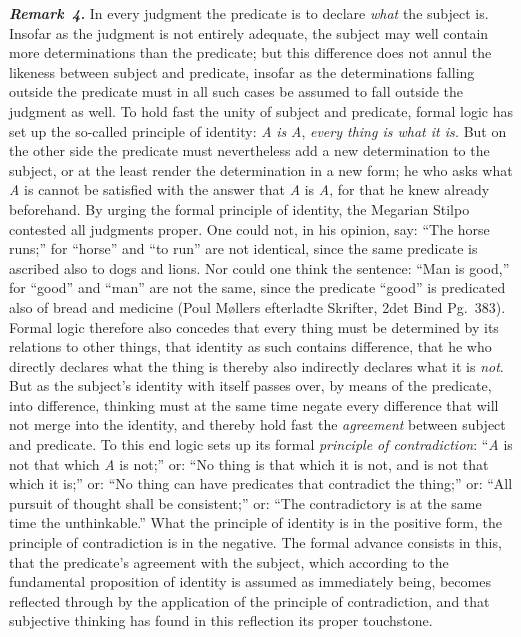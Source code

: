 \documentclass[12pt]{book}
\newcommand{\anm}[1]{\emph{\textbf{Remark~#1.}}}
\begin{document}
\anm{4} In every judgment the predicate is to declare \emph{what} the
subject is. Insofar as the judgment is not entirely adequate, the subject
may well contain more determinations than the predicate; but this difference
does not annul the likeness between subject and predicate, insofar as the
determinations falling outside the predicate must in all such cases be
assumed to fall outside the judgment as well. To hold fast the unity of
subject and predicate, formal logic has set up the so-called principle of
identity: \textit{A} \emph{is} \textit{A}, \emph{every thing is what it
is.} But on the other side the predicate must nevertheless add a new
determination to the subject, or at the least render the determination in a
new form; he who asks what \textit{A} is cannot be satisfied with the answer
that \textit{A} is \textit{A}, for that he knew already beforehand. By
urging the formal principle of identity, the Megarian Stilpo contested all
judgments proper. One could not, in his opinion, say: ``The horse runs;''
for ``horse'' and ``to run'' are not identical, since the same predicate is
ascribed also to dogs and lions. Nor could one think the sentence: ``Man is
good,'' for ``good'' and ``man'' are not the same, since the predicate
``good'' is predicated also of bread and medicine (Poul Møllers efterladte
Skrifter, 2det Bind Pg.\ 383). Formal logic therefore also concedes that
every thing must be determined by its relations to other things, that
identity as such contains difference, that he who directly declares what the
thing is thereby also indirectly declares what it is \emph{not}. But as the
subject's identity with itself passes over, by means of the predicate, into
difference, thinking must at the same time negate every difference that will
not merge into the identity, and thereby hold fast the \emph{agreement}
between subject and predicate. To this end logic sets up its formal
\emph{principle of contradiction}: ``\textit{A} is not that which \textit{A}
is not;'' or: ``No thing is that which it is not, and is not that which it
is;'' or: ``No thing can have predicates that contradict the thing;'' or:
``All pursuit of thought shall be consistent;'' or: ``The contradictory is
at the same time the unthinkable.'' What the principle of identity is in the
positive form, the principle of contradiction is in the negative. The formal
advance consists in this, that the predicate's agreement with the subject,
which according to the fundamental proposition of identity is assumed as
immediately being, becomes reflected through by the application of the
principle of contradiction, and that subjective thinking has found in this
reflection its proper touchstone.
\end{document}
